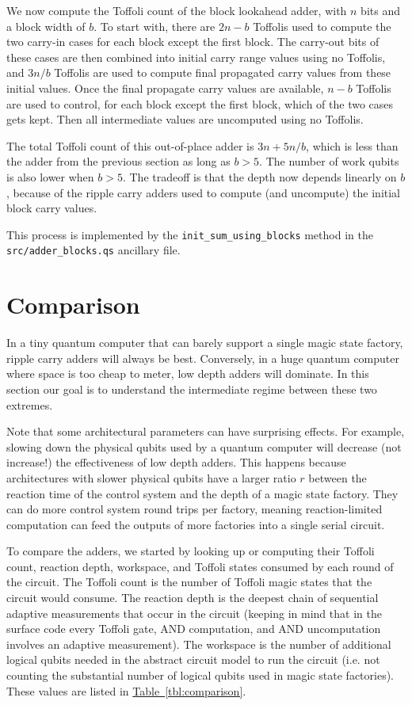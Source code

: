 \documentclass[onecolumn,unpublished]{quantumarticle}
\theoremstyle{definition}
\theoremstyle{definition}
\theoremstyle{definition}
\newcommand{\tbl}[1]{\hyperref[tbl:#1]{Table~\ref*{tbl:#1}}}
\begin{document}
We now compute the Toffoli count of the block lookahead adder, with $n$ bits and a block width of $b$.
To start with, there are $2n-b$ Toffolis used to compute the two carry-in cases for each block except the first block.
The carry-out bits of these cases are then combined into initial carry range values using no Toffolis, and $3n/b$ Toffolis are used to compute final propagated carry values from these initial values.
Once the final propagate carry values are available, $n-b$ Toffolis are used to control, for each block except the first block, which of the two cases gets kept.
Then all intermediate values are uncomputed using no Toffolis.

The total Toffoli count of this out-of-place adder is $3n + 5n/b$, which is less than the adder from the previous section as long as $b > 5$.
The number of work qubits is also lower when $b > 5$.
The tradeoff is that the depth now depends linearly on $b$, because of the ripple carry adders used to compute (and uncompute) the initial block carry values.

This process is implemented by the \texttt{init\_sum\_using\_blocks} method in the \\\texttt{src/adder\_blocks.qs} ancillary file.


\section{Comparison}
\label{sec:estimate}

In a tiny quantum computer that can barely support a single magic state factory, ripple carry adders will always be best.
Conversely, in a huge quantum computer where space is too cheap to meter, low depth adders will dominate.
In this section our goal is to understand the intermediate regime between these two extremes.

Note that some architectural parameters can have surprising effects.
For example, slowing down the physical qubits used by a quantum computer will decrease (not increase!) the effectiveness of low depth adders.
This happens because architectures with slower physical qubits have a larger ratio $r$ between the reaction time of the control system and the depth of a magic state factory.
They can do more control system round trips per factory, meaning reaction-limited computation can feed the outputs of more factories into a single serial circuit.

To compare the adders, we started by looking up or computing their Toffoli count, reaction depth, workspace, and Toffoli states consumed by each round of the circuit.
The Toffoli count is the number of Toffoli magic states that the circuit would consume.
The reaction depth is the deepest chain of sequential adaptive measurements that occur in the circuit (keeping in mind that in the surface code every Toffoli gate, AND computation, and AND uncomputation involves an adaptive measurement).
The workspace is the number of additional logical qubits needed in the abstract circuit model to run the circuit (i.e. not counting the substantial number of logical qubits used in magic state factories).
These values are listed in \tbl{comparison}.
\end{document}
